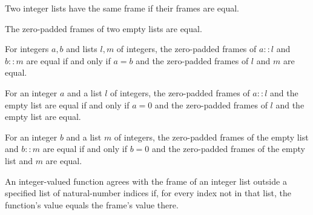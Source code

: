 \begin{definition}
\label{Light.SameFrame}
\leanok
{}
Two integer lists have the same frame if their frames are equal.
\end{definition}

\begin{theorem}
\label{Light.sameFrame_nil}
\leanok
{}
The zero-padded frames of two empty lists are equal.
\end{theorem}

\begin{theorem}
\label{Light.sameFrame_cons_cons}
\leanok
{}
For integers $a,b$ and lists $l,m$ of integers, the zero-padded frames of $a::l$ and
$b::m$ are equal if and only if $a=b$ and the zero-padded frames of $l$ and $m$ are
equal.
\end{theorem}

\begin{theorem}
\label{Light.sameFrame_cons_nil}
\leanok
{}
For an integer $a$ and a list $l$ of integers, the zero-padded frames of $a::l$ and the
empty list are equal if and only if $a=0$ and the zero-padded frames of $l$ and the
empty list are equal.
\end{theorem}

\begin{theorem}
\label{Light.sameFrame_nil_cons}
\leanok
{}
For an integer $b$ and a list $m$ of integers, the zero-padded frames of the empty list
and $b::m$ are equal if and only if $b=0$ and the zero-padded frames of the empty list
and $m$ are equal.
\end{theorem}

\begin{definition}
\label{Light.LocalsBut}
\leanok
{}
An integer-valued function agrees with the frame of an integer list outside a specified
list of natural-number indices if, for every index not in that list, the function’s
value equals the frame’s value there.
\end{definition}

